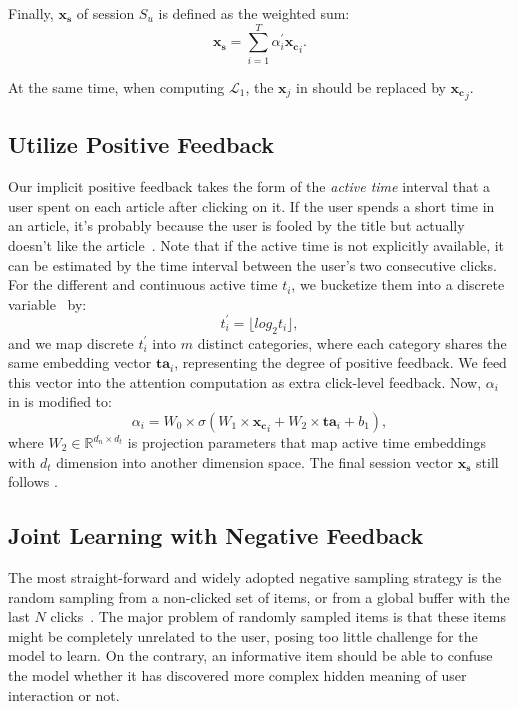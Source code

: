 Finally, $\mathbf{x_s}$ of session $S_u$ is defined as the weighted sum:
\begin{equation}
    \label{eq:final_repre}
    \mathbf{x_s} = \sum_{i=1}^{T} \alpha_i^{\prime} \mathbf{x_{c}}_i.
\end{equation}

At the same time, when computing $\mathcal{L}_1$, the $\mathbf{x}_j$ in  should be replaced by $\mathbf{x_{c}}_j$.

\subsection{Utilize Positive Feedback}
\label{sec:positive feedback}
Our implicit positive feedback takes the form of the \textit{active time} interval that 
a user spent on each article after clicking on it. If the user spends a short time 
in an article, it's probably because the user is fooled by the title but actually doesn't like 
the article~\cite{lu_quality_2019}. Note that if the active time is not explicitly available, 
it can be estimated by the time interval between the user's two consecutive clicks. 
For the different and continuous active time $t_i$, 
we bucketize them into a discrete variable~\cite{wu2020CPRS} by: 
\begin{equation}
    t_i^{\prime}=\lfloor log_2{t_i} \rfloor,
\end{equation}
and we map discrete $t_i^{\prime}$ into $m$ distinct categories, 
where each category shares the same embedding vector $\mathbf{ta}_i$, representing the degree  of positive feedback. We feed this vector into the attention computation as extra click-level 
feedback. Now, $\alpha_i$ in  is modified to:
\begin{equation}
    \alpha_i = W_0 \times \sigma (W_1 \times \mathbf{x_{c}}_i + W_2 \times \mathbf{ta}_i + b_1),
\end{equation}
where $W_2 \in \mathbb{R}^{d_n \times d_t}$ is projection parameters that map active time embeddings with $d_t$ dimension into another dimension space. The final session vector $\mathbf{x_s}$ still follows
.

\subsection{Joint Learning with Negative Feedback}
\label{sec:negative feedback}
The most straight-forward and widely adopted negative sampling strategy is the random sampling 
from a non-clicked set of items, or from a global buffer with the last $N$ 
clicks~\cite{moreira_news_2018}. 
The major problem of randomly sampled items is that these items might be completely unrelated to 
the user, posing too little challenge for the model to learn. On the contrary, an informative item should be able to confuse the model whether it has discovered more complex hidden meaning of user interaction or not.

